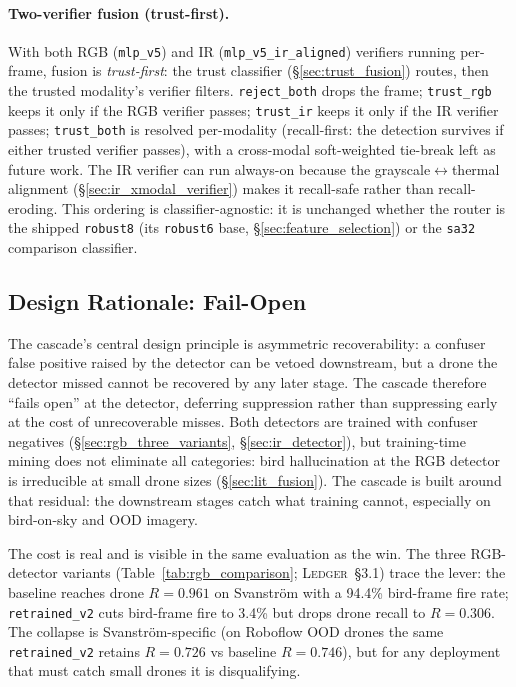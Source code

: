 \paragraph{Two-verifier fusion (trust-first).} With both RGB (\texttt{mlp\_v5}) and IR (\texttt{mlp\_v5\_ir\_aligned}) verifiers running per-frame, fusion is \emph{trust-first}: the trust classifier (\S\ref{sec:trust_fusion}) routes, then the trusted modality's verifier filters. \texttt{reject\_both} drops the frame; \texttt{trust\_rgb} keeps it only if the RGB verifier passes; \texttt{trust\_ir} keeps it only if the IR verifier passes; \texttt{trust\_both} is resolved per-modality (recall-first: the detection survives if either trusted verifier passes), with a cross-modal soft-weighted tie-break left as future work. The IR verifier can run always-on because the grayscale$\leftrightarrow$thermal alignment (\S\ref{sec:ir_xmodal_verifier}) makes it recall-safe rather than recall-eroding. This ordering is classifier-agnostic: it is unchanged whether the router is the shipped \texttt{robust8} (its \texttt{robust6} base, \S\ref{sec:feature_selection}) or the \texttt{sa32} comparison classifier.

\subsection{Design Rationale: Fail-Open}
\label{sec:design_rationale}

The cascade's central design principle is asymmetric recoverability: a confuser false positive raised by the detector can be vetoed downstream, but a drone the detector missed cannot be recovered by any later stage. The cascade therefore ``fails open'' at the detector, deferring suppression rather than suppressing early at the cost of unrecoverable misses. Both detectors are trained with confuser negatives (\S\ref{sec:rgb_three_variants}, \S\ref{sec:ir_detector}), but training-time mining does not eliminate all categories: bird hallucination at the RGB detector is irreducible at small drone sizes (\S\ref{sec:lit_fusion}). The cascade is built around that residual: the downstream stages catch what training cannot, especially on bird-on-sky and OOD imagery.

The cost is real and is visible in the same evaluation as the win. The three RGB-detector variants (Table~\ref{tab:rgb_comparison}; \textsc{Ledger}~\S3.1) trace the lever: the baseline reaches drone $R=0.961$ on Svanstr\"om with a 94.4\% bird-frame fire rate; \texttt{retrained\_v2} cuts bird-frame fire to 3.4\% but drops drone recall to $R=0.306$. The collapse is Svanstr\"om-specific (on Roboflow OOD drones the same \texttt{retrained\_v2} retains $R=0.726$ vs baseline $R=0.746$), but for any deployment that must catch small drones it is disqualifying.

